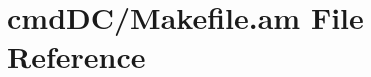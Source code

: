 \hypertarget{cmd_d_c_2_makefile_8am}{}\section{cmd\+D\+C/\+Makefile.am File Reference}
\label{cmd_d_c_2_makefile_8am}
